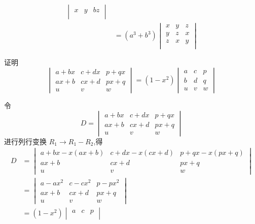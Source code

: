 \begin{questions}
\begin{solution}
\begin{align*}
\begin{vmatrix}
            x & y & bz \\
            \end{vmatrix}\\
            &=(a^3+b^3)\begin{vmatrix}
                x & y & z \\
                y & z & x \\
                z & x & y \\
                \end{vmatrix}
        \end{align*}
    \end{solution}
    
    \question 证明
    \[
    \begin{vmatrix} 
    a+bx & c+dx & p+qx \\ 
    ax+b & cx+d & px+q \\ 
    u & v & w 
    \end{vmatrix} 
    = (1-x^2) 
    \begin{vmatrix} 
    a & c & p \\ 
    b & d & q \\ 
    u & v & w 
    \end{vmatrix}
    \]
    \begin{solution}
        令
        \[
        D=
        \begin{vmatrix} 
        a+bx & c+dx & p+qx \\ 
        ax+b & cx+d & px+q \\ 
        u & v & w 
        \end{vmatrix} 
        \]
        进行列行变换 \( R_1 \rightarrow R_1 - R_2 \),得
        \begin{align*}
        D &=
        \begin{vmatrix} 
        a+bx-x(ax+b) & c+dx-x(cx+d) & p+qx-x(px+q) \\ 
        ax+b & cx+d & px+q \\ 
        u & v & w 
        \end{vmatrix} \\
        &= 
        \begin{vmatrix} 
        a-ax^2 & c-cx^2 & p-px^2 \\ 
        ax+b & cx+d & px+q \\ 
        u & v & w 
        \end{vmatrix} \\
        &= (1-x^2) 
        \begin{vmatrix} 
        a & c & p \\ 

\end{vmatrix}
\end{align*}
\end{solution}
\end{questions}
